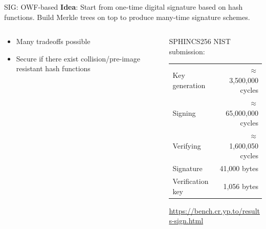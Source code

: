 \documentclass[xcolor=table,10pt,aspectratio=169]{beamer}
\begin{document}
\begin{frame}[label={sec:org7432b5c}]{SIG: OWF-based}
\textbf{Idea}: Start from one-time digital signature based on hash functions. Build Merkle trees on top to produce many-time signature schemes.

\begin{columns}[t]
\begin{column}{0.5\columnwidth}
\begin{itemize}
\item Many tradeoffs possible
\item Secure if there exist collision/pre-image resistant hash functions
\end{itemize}
\end{column}

\begin{column}{0.5\columnwidth}
SPHINCS256 NIST submission:

\begin{center}
\begin{tabular}{lr}
Key generation & \(\approx\)  3,500,000 cycles\\
Signing & \(\approx\) 65,000,000 cycles\\
Verifying & \(\approx\)  1,600,050 cycles\\
Signature & 41,000 bytes\\
Verification key & 1,056 bytes\\
\end{tabular}

\end{center}

\small \url{https://bench.cr.yp.to/results-sign.html}
\end{column}
\end{columns}
\end{frame}
\end{document}
